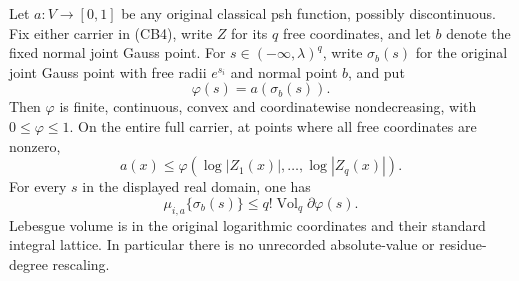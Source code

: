 \begin{lemma}
\label{lem:r16-crossed-box-Gauss-atom}
Let $a:V\to[0,1]$ be any original classical psh function, possibly
discontinuous. Fix either carrier in (CB4), write $Z$ for its
$q$ free coordinates, and let $b$ denote the fixed normal joint
Gauss point. For $s\in(-\infty,\lambda)^q$, write $\sigma_b(s)$
for the original joint Gauss point with free radii $e^{s_i}$
and normal point $b$, and put
\[
                         \varphi(s)=a(\sigma_b(s)).
 \tag{CB9}
\]
Then $\varphi$ is finite, continuous, convex and coordinatewise
nondecreasing, with $0\le\varphi\le1$. On the entire full carrier,
at points where all free coordinates are nonzero,
\[
                  a(x)\le
                \varphi(\log|Z_1(x)|,\ldots,\log|Z_q(x)|).
 \tag{CB10}
\]
For every $s$ in the displayed real domain, one has
\[
                   \mu_{i,a}\{\sigma_b(s)\}
                       \le q!\operatorname{Vol}_q\partial\varphi(s).
 \tag{CB11}
\]
Lebesgue volume is in the original logarithmic coordinates and
their standard integral lattice. In particular there is no
unrecorded absolute-value or residue-degree rescaling.
\end{lemma}

